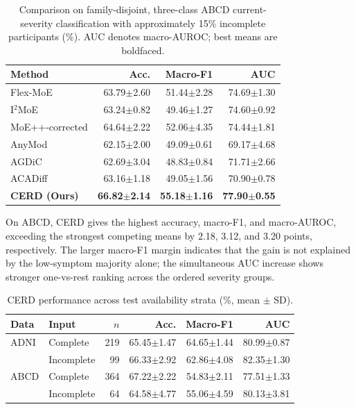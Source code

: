\documentclass[a4paper,fleqn]{cas-dc}
\begin{document}
\begin{table}[t]
\centering
\caption{Comparison on family-disjoint, three-class ABCD current-severity classification with approximately 15\% incomplete participants (\%). AUC denotes macro-AUROC; best means are boldfaced.}
\label{tab:abcd_results}
\setlength{\tabcolsep}{3pt}
\renewcommand{\arraystretch}{1.08}
\small
\begin{tabular*}{\columnwidth}{@{\extracolsep{\fill}}lrrr@{}}
\toprule
\textbf{Method} & \textbf{Acc.} & \textbf{Macro-F1} & \textbf{AUC} \\
\midrule
Flex-MoE
& 63.79$\pm$2.60 & 51.44$\pm$2.28 & 74.69$\pm$1.30 \\
I$^2$MoE
& 63.24$\pm$0.82 & 49.46$\pm$1.27 & 74.60$\pm$0.92 \\
MoE++-corrected
& 64.64$\pm$2.22 & 52.06$\pm$4.35 & 74.44$\pm$1.81 \\
AnyMod
& 62.15$\pm$2.00 & 49.09$\pm$0.61 & 69.17$\pm$4.68 \\
AGDiC
& 62.69$\pm$3.04 & 48.83$\pm$0.84 & 71.71$\pm$2.66 \\
ACADiff
& 63.16$\pm$1.18 & 49.05$\pm$1.56 & 70.90$\pm$0.78 \\
\textbf{CERD (Ours)}
& \textbf{66.82$\pm$2.14} & \textbf{55.18$\pm$1.16} & \textbf{77.90$\pm$0.55} \\
\bottomrule
\end{tabular*}
\end{table}

On ABCD, CERD gives the highest accuracy, macro-F1, and macro-AUROC, exceeding the strongest competing means by 2.18, 3.12, and 3.20 points, respectively. The larger macro-F1 margin indicates that the gain is not explained by the low-symptom majority alone; the simultaneous AUC increase shows stronger one-vs-rest ranking across the ordered severity groups.

\begin{table}[t]
\centering
\caption{CERD performance across test availability strata (\%, mean $\pm$ SD).}
\label{tab:availability_strata}
\setlength{\tabcolsep}{2.2pt}
\renewcommand{\arraystretch}{1.08}
\scriptsize
\begin{tabular*}{\columnwidth}{@{\extracolsep{\fill}}llrrrr@{}}
\toprule
\textbf{Data} & \textbf{Input} & \(n\) & \textbf{Acc.} & \textbf{Macro-F1} & \textbf{AUC} \\
\midrule
ADNI & Complete & 219 & 65.45$\pm$1.47 & 64.65$\pm$1.44 & 80.99$\pm$0.87 \\
 & Incomplete & 99 & 66.33$\pm$2.92 & 62.86$\pm$4.08 & 82.35$\pm$1.30 \\
ABCD & Complete & 364 & 67.22$\pm$2.22 & 54.83$\pm$2.11 & 77.51$\pm$1.33 \\
 & Incomplete & 64 & 64.58$\pm$4.77 & 55.06$\pm$4.59 & 80.13$\pm$3.81 \\
\bottomrule
\end{tabular*}
\end{table}
\end{document}
